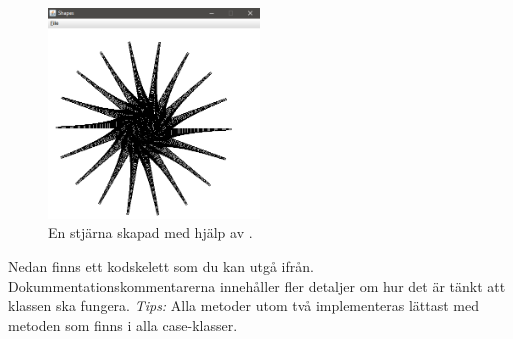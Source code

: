 \begin{figure}
\centering
\includegraphics[width=0.5\textwidth]{../img/w06-lab/RectangleSequence.png}
\caption {En stjärna skapad med hjälp av .}
\label{fig:classes:graphics:rectanglesequence}
\end{figure}

\noindent Nedan finns ett kodskelett som du kan utgå ifrån. Dokummentationskommentarerna innehåller fler detaljer om hur det är tänkt att klassen ska fungera. %
 \emph{Tips:} Alla metoder utom två implementeras lättast med metoden  som finns i alla case-klasser.

\begin{figure}[H]
\label{code:classes:graphics:rectanglesequence}
\end{figure}


